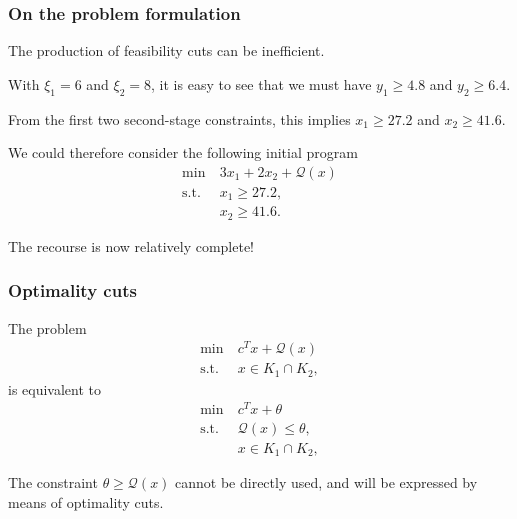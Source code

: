 \documentclass{beamer}
\begin{document}
\begin{frame}
	\frametitle{On the problem formulation}
	
	The production of feasibility cuts can be inefficient.
	
	\mbox{}
	
	With $\xi_1 = 6$ and $\xi_2 = 8$, it is easy to see that we must have $y_1 \geq	4.8$ and $y_2 \geq 6.4$.
	
	\mbox{}
	
	From the first two second-stage constraints, this implies $x_1 \geq 27.2$ and $x_2 \geq 41.6$.
	
	\mbox{}
	
	We could therefore consider the following initial program
	\begin{align*}
	\min\ & 3x_1 + 2x_2 + \mathcal{Q}(x) \\
	\mbox{s.t. } & x_1 \geq 27.2, \\
	& x_2 \geq 41.6.
	\end{align*}
	
	The recourse is now relatively complete!
	
\end{frame}


\begin{frame}
	\frametitle{Optimality cuts}
	
	The problem
	\begin{align*}
		\min\ & c^Tx + \mathcal{Q}(x) \\
		\mbox{s.t. } & x \in K_1 \cap K_2,
	\end{align*}
	is equivalent to
	\begin{align*}
		\min\ & c^Tx + \theta \\
		\mbox{s.t. } & \mathcal{Q}(x) \leq \theta, \\
		& x \in K_1 \cap K_2,
	\end{align*}
	
The constraint $\theta \geq \mathcal{Q}(x)$ cannot be directly used, and will be expressed by means of optimality cuts.

\end{frame}
\end{document}
